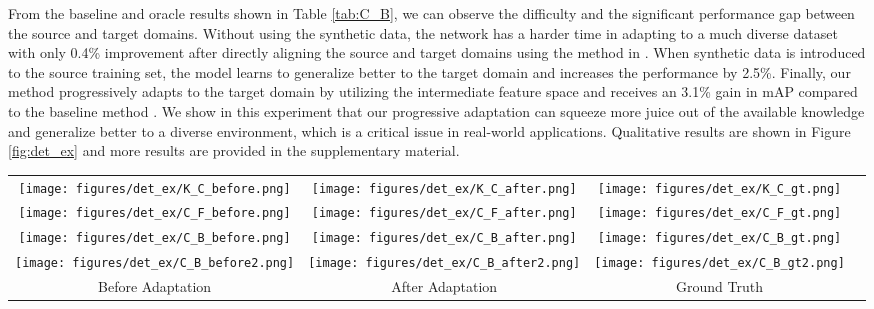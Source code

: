 \documentclass[10pt,twocolumn,letterpaper]{article}
\begin{document}
From the baseline and oracle results shown in Table \ref{tab:C_B}, we can observe the difficulty and the significant performance gap between the source and target domains.
Without using the synthetic data, the network has a harder time in adapting to a much diverse dataset with only 0.4\% improvement after directly aligning the source and target domains using the method in \cite{chen2018domain}.
When synthetic data is introduced to the source training set, the model learns to generalize better to the target domain and increases the performance by 2.5\%.
Finally, our method progressively adapts to the target domain by utilizing the intermediate feature space and receives an 3.1\% gain in mAP compared to the baseline method \cite{chen2018domain}.
We show in this experiment that our progressive adaptation can squeeze more juice out of the available knowledge and generalize better to a diverse environment, which is a critical issue in real-world applications.
Qualitative results are shown in Figure \ref{fig:det_ex} and more results are provided in the supplementary material.


\begin{figure*}[t]
\centering
\begin{tabular}{c@{\hspace{0.005\linewidth}}c@{\hspace{0.005\linewidth}}c@{\hspace{0.005\linewidth}}c}

\texttt{[image: figures/det\_ex/K\_C\_before.png]} & 
\texttt{[image: figures/det\_ex/K\_C\_after.png]} &
\texttt{[image: figures/det\_ex/K\_C\_gt.png]} &\\

\texttt{[image: figures/det\_ex/C\_F\_before.png]} & 
\texttt{[image: figures/det\_ex/C\_F\_after.png]} &
\texttt{[image: figures/det\_ex/C\_F\_gt.png]} &\\

\texttt{[image: figures/det\_ex/C\_B\_before.png]} & 
\texttt{[image: figures/det\_ex/C\_B\_after.png]} &
\texttt{[image: figures/det\_ex/C\_B\_gt.png]} &\\

\texttt{[image: figures/det\_ex/C\_B\_before2.png]} & 
\texttt{[image: figures/det\_ex/C\_B\_after2.png]} &
\texttt{[image: figures/det\_ex/C\_B\_gt2.png]} &\\
{Before Adaptation} & {After Adaptation} & {Ground Truth} & \\
\end{tabular}
\vspace{0.05em}
\caption{
Examples of the detection results from our three adaptation tasks.
The first two rows are the tasks KITTI  Cityscapes and Cityscapes  Foggy Cityscapes respectively, while the last two rows are the task Cityscapes  BDD100k.
We show the detection results on the target domain before and after applying our adaptation method as well as the ground truth labels.
}
\label{fig:det_ex}
\end{figure*}
\vspace{-1mm}
\end{document}

